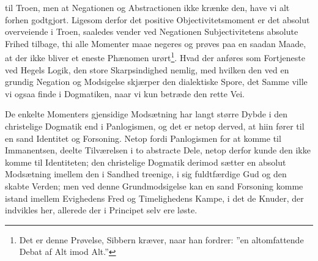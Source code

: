 \documentclass[12pt]{book}
\newcommand{\opage}[1]{\marginnote{\footnotesize\textit{[#1]}}}
\begin{document}
\opage{147} \setcounter{footnote}{0}%
til Troen, men at Negationen og Abstractionen ikke krænke den, have vi alt forhen
godtgjort. Ligesom derfor det positive Objectivitetsmoment er det absolut
overveiende i Troen, saaledes vender ved Negationen Subjectivitetens absolute
Frihed tilbage, thi alle Momenter maae negeres og prøves paa en saadan Maade, at
der ikke bliver et eneste Phænomen urørt\footnote{Det er denne Prøvelse, Sibbern
kræver, naar han fordrer: ”en altomfattende Debat af Alt imod Alt.”}. Hvad der
anføres som Fortjeneste ved Hegels Logik, den store Skarpsindighed nemlig, med
hvilken den ved en grundig Negation og Modsigelse skjærper den dialektiske Spore,
det Samme ville vi ogsaa finde i Dogmatiken, naar vi kun betræde den rette Vei.

De enkelte Momenters gjensidige Modsætning har langt større Dybde i den
christelige Dogmatik end i Panlogismen, og det er netop derved, at hiin fører til
en sand Identitet og Forsoning. Netop fordi Panlogismen for at komme til
Immanentsen, deelte Tilværelsen i to abstracte Dele, netop derfor kunde den ikke
komme til Identiteten; den christelige Dogmatik derimod sætter en absolut
Modsætning imellem den i Sandhed treenige, i sig fuldtfærdige Gud og den skabte
Verden; men ved denne Grundmodsigelse kan en sand Forsoning komme istand imellem
Evighedens Fred og Timelighedens Kampe, i det de Knuder, der indvikles her,
allerede der i Principet selv ere løste.
\end{document}
